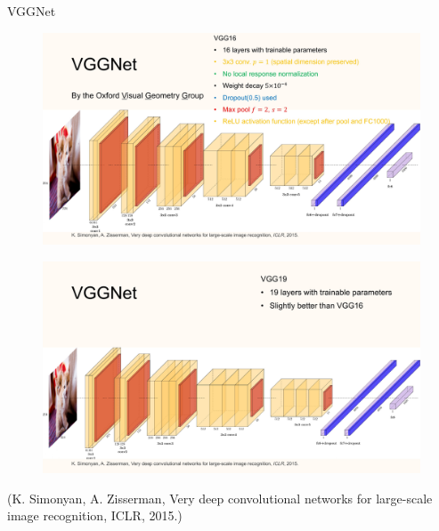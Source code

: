 \begin{frame}[allowframebreaks]

\begin{mydefinitionblock}{7.8}{VGGNet}
    \begin{figure}[H]
        \centering
        \includegraphics[width=1.0\textwidth]{.././assets/7.7.jpg}
    \end{figure}

    \begin{figure}[H]
        \centering
        \includegraphics[width=1.0\textwidth]{.././assets/7.8.jpg}
    \end{figure}

    (K. Simonyan, A. Zisserman, Very deep convolutional networks for large-scale image recognition, ICLR, 2015.)
\end{mydefinitionblock}

\end{frame}

